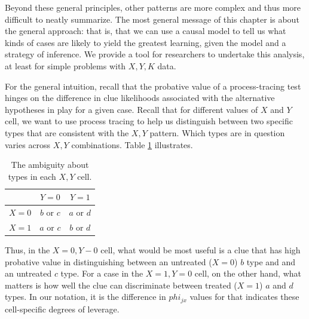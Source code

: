 \documentclass[12pt,]{book}
\begin{document}
Beyond these general principles, other patterns are more complex and thus more difficult to neatly summarize. The most general message of this chapter is about the general approach: that is, that we can use a causal model to tell us what kinds of cases are likely to yield the greatest learning, given the model and a strategy of inference. We provide a tool for researchers to undertake this analysis, at least for simple problems with \(X, Y, K\) data.

For the general intuition, recall that the probative value of a process-tracing test hinges on the difference in clue likelihoods associated with the alternative hypotheses in play for a given case. Recall that for different values of \(X\) and \(Y\) cell, we want to use process tracing to help us distinguish between two specific types that are consistent with the \(X, Y\) pattern. Which types are in question varies across \(X,Y\) combinations. Table \ref{FP} illustrates.

\begin{table}[h!]
\centering
\begin{tabular}{c|cc}
           &        $Y=0$ &        $Y=1$ \\ \hline
       $X=0$ &     $b$ or $c$ &     $a$ or $d$ \\
       $X=1$ &     $a$ or $c$ &     $b$ or $d$ \\
\end{tabular}  
\caption{The ambiguity about types in each $X, Y$ cell.}
\label{FP} 
\end{table}

Thus, in the \(X=0, Y-0\) cell, what would be most useful is a clue that has high probative value in distinguishing between an untreated (\(X=0\)) \(b\) type and and an untreated \(c\) type. For a case in the \(X=1, Y=0\) cell, on the other hand, what matters is how well the clue can discriminate between treated (\(X=1\)) \(a\) and \(d\) types. In our notation, it is the difference in \(phi_{jx}\) values for that indicates these cell-specific degrees of leverage.
\end{document}
